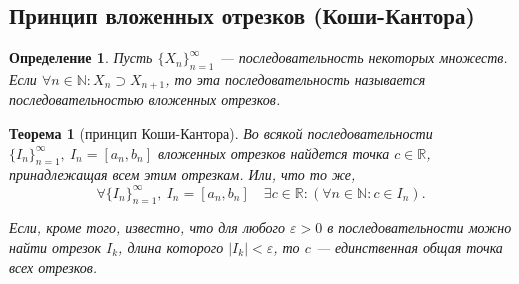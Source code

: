 \documentclass[a4paper,12pt]{article} %
\newtheorem{definition}{Определение}[section]
\newtheorem{theorem}{Теорема}[section]
\theoremstyle{remark}
\theoremstyle{definition}
\begin{document}
\subsection{Принцип вложенных отрезков (Коши-Кантора)}
\begin{definition}
	Пусть $\{X_n\}_{n=1}^{\infty}$ --- последовательность некоторых множеств. Если $\forall n\in \mathbb{N}:X_n\supset X_{n+1}$, то эта последовательность называется последовательностью вложенных отрезков.
\end{definition}
\begin{theorem}[принцип Коши-Кантора]
	Во всякой последовательности $\{I_n\}_{n=1}^{\infty}, \ I_n = [a_n, b_n]$ вложенных отрезков найдется точка $c \in \mathbb{R}$, принадлежащая всем этим отрезкам. Или, что то же,
	\[
	\forall \{I_n\}_{n=1}^{\infty}, \ I_n = [a_n, b_n] \quad \exists c\in \mathbb{R} : (\forall n\in \mathbb{N} : c \in I_n)
	.\] 

	Если, кроме того, известно, что для любого $\varepsilon > 0$ в последовательности можно найти отрезок $I_k$, длина которого $|I_k| < \varepsilon$, то $c$ --- единственная общая точка всех отрезков.
\end{theorem}
\end{document}

